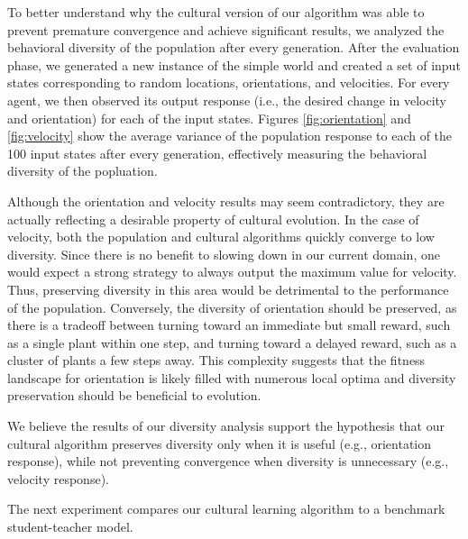 \documentclass{acm_proc_article-sp}
\begin{document}
To better understand why the cultural version of our algorithm was able to prevent premature convergence and achieve significant results, we analyzed the behavioral diversity of the population after every generation. After the evaluation phase, we generated a new instance of the simple world and created a set of input states corresponding to random locations, orientations, and velocities. For every agent, we then observed its output response (i.e., the desired change in velocity and orientation) for each of the input states. Figures \ref{fig:orientation} and \ref{fig:velocity} show the average variance of the population response to each of the 100 input states after every generation, effectively measuring the behavioral diversity of the popluation.

Although the orientation and velocity results may seem contradictory, they are actually reflecting a desirable property of cultural evolution. In the case of velocity, both the population and cultural algorithms quickly converge to low diversity. Since there is no benefit to slowing down in our current domain, one would expect a strong strategy to always output the maximum value for velocity. Thus, preserving diversity in this area would be detrimental to the performance of the population. Conversely, the diversity of orientation should be preserved, as there is a tradeoff between turning toward an immediate but small reward, such as a single plant within one step, and turning toward a delayed reward, such as a cluster of plants a few steps away. This complexity suggests that the fitness landscape for orientation  is likely filled with numerous local optima and diversity preservation should be beneficial to evolution. 

We believe the results of our diversity analysis support the hypothesis that our cultural algorithm preserves diversity only when it is useful (e.g., orientation response), while not preventing convergence when diversity is unnecessary (e.g., velocity response).


The next experiment compares our cultural learning algorithm to a benchmark student-teacher model.
\end{document}
